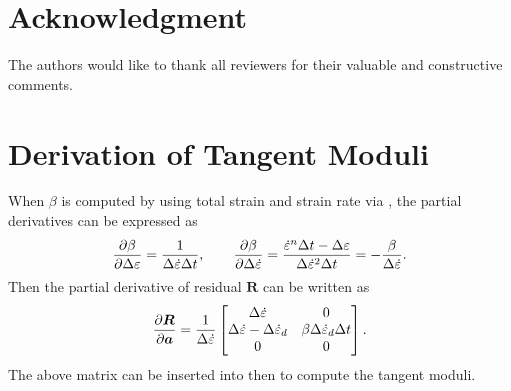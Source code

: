 \section{Acknowledgment}
The authors would like to thank all reviewers for their valuable and constructive comments.
\appendix
\section{Derivation of Tangent Moduli}
When $\beta$ is computed by using total strain and strain rate via , the partial derivatives can be expressed as
\begin{gather}
\dfrac{\partial\beta}{\partial\Delta\varepsilon}=\dfrac{1}{\Delta\dot\varepsilon\Delta{}t},\qquad\dfrac{\partial\beta}{\partial\Delta\dot\varepsilon}=\dfrac{\dot\varepsilon^n\Delta{}t-\Delta\varepsilon}{\Delta\dot\varepsilon^2\Delta{}t}=-\dfrac{\beta}{\Delta\dot\varepsilon}.
\end{gather}
Then the partial derivative of residual $\mathbold{R}$ can be written as
\begin{gather}
\dfrac{\partial\bm{R}}{\partial\bm{a}}=\dfrac{1}{\Delta\dot\varepsilon}\begin{bmatrix}
	\Delta\dot\varepsilon                         & 0                                     \\
	\Delta\dot\varepsilon-\Delta\dot\varepsilon_d & \beta\Delta\dot\varepsilon_d\Delta{}t \\
	0                                             & 0
\end{bmatrix}.
\end{gather}
The above matrix can be inserted into  then  to compute the tangent moduli.
